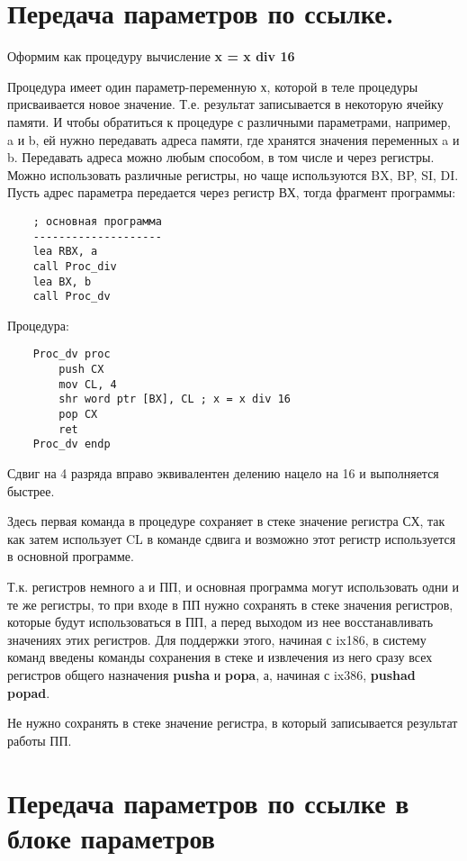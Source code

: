\section{Передача параметров по ссылке.}

Оформим как процедуру вычисление \textbf{x = x div 16}

Процедура имеет один параметр-переменную х, которой в теле процедуры присваивается новое значение. Т.е. результат записывается в некоторую ячейку памяти. И чтобы обратиться к процедуре с различными параметрами, например,
a и b, ей нужно передавать адреса памяти, где хранятся значения переменных a и b. Передавать адреса можно любым способом, в том числе и через регистры. Можно использовать различные регистры, но чаще используются BX, BP, SI, DI.
Пусть адрес параметра передается через регистр ВХ, тогда фрагмент программы:
\begin{verbatim}
    ; основная программа
    --------------------
    lea RBX, a
    call Proc_div
    lea BX, b
    call Proc_dv
\end{verbatim}

Процедура:
\begin{verbatim}
    Proc_dv proc
        push CX
        mov CL, 4
        shr word ptr [BX], CL ; x = x div 16
        pop CX
        ret
    Proc_dv endp
\end{verbatim}
Сдвиг на 4 разряда вправо эквивалентен делению нацело на 16 и выполняется быстрее.

Здесь первая команда в процедуре сохраняет в стеке значение регистра СХ, так как затем использует CL в команде сдвига и возможно этот регистр используется в основной программе.

Т.к. регистров немного а и ПП, и основная программа могут использовать одни и те же регистры, то при входе в ПП нужно сохранять в стеке значения регистров, которые будут использоваться в ПП, а перед выходом из нее восстанавливать значениях этих регистров.
Для поддержки  этого, начиная с ix186, в систему команд введены команды сохранения в стеке и извлечения из него сразу всех регистров общего назначения
\textbf{pusha} и \textbf{popa}, а, начиная с ix386, \textbf{pushad popad}.

Не нужно сохранять в стеке значение регистра, в который записывается результат работы ПП.

\section{Передача параметров по ссылке в блоке параметров}

